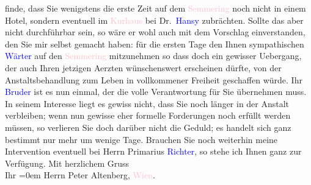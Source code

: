                     finde, dass Sie wenigstens die erste Zeit auf dem \textcolor{pink}{Semmering}{}\ledrightnote{\textcolor{pink}{Semmering}} noch nicht in einem Hotel, sondern eventuell im \textcolor{pink}{Kurhaus}{}\ledrightnote{\textcolor{pink}{Kurhaus Semmering}} bei Dr. \textcolor{blue}{Hansy}{}\ledrightnote{\textcolor{blue}{Franz Hansy}} zubrächten. Sollte das aber nicht durchführbar sein, so wäre er
                    wohl auch mit dem Vorschlag einverstanden, den Sie mir selbst gemacht haben: für
                    die ersten Tage den Ihnen sympathischen \textcolor{blue}{Wärter}{} auf den \textcolor{pink}{Semmering}{}\ledrightnote{\textcolor{pink}{Semmering}} mitzunehmen {\pb}so dass doch ein
                    gewisser Uebergang, der auch Ihren jetzigen Aerzten wünschenswert erscheinen
                    dürfte, von der Anstaltsbehandlung zum Leben in vollkommener Freiheit geschaffen
                    würde. Ihr \textcolor{blue}{Bruder}{} ist es
                    nun einmal, der die volle Verantwortung für Sie übernehmen muss. In seinem
                    Interesse liegt es gewiss nicht, dass Sie noch länger in der Anstalt verbleiben;
                    wenn nun gewisse eher formelle Forderungen noch erfüllt werden müssen, so
                    verlieren Sie doch darüber nicht die Geduld; es handelt sich ganz bestimmt nur
                    mehr um wenige Tage. Brauchen Sie noch weiterhin meine Intervention eventuell
                    bei Herrn Primarius \textcolor{blue}{Richter}{}\ledrightnote{\textcolor{blue}{Karl Richter}}, so stehe ich
                    Ihnen ganz zur Verfügung.\pend
           \pstart
           Mit herzlichem Gruss{\\[\baselineskip]}Ihr \pend
           \leftskip=0em{}\pstart
           \noindent{}Herrn Peter Altenberg, \textcolor{pink}{Wien}{}\ledrightnote{\textcolor{pink}{Wien}}.\pend
           \endnumbering{}  
      